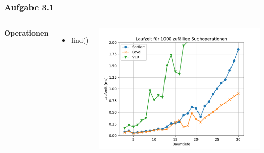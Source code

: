 \documentclass[aspectratio=169]{beamer}
\begin{document}
\begin{frame}
\frametitle{Aufgabe 3.1}
\begin{columns}[c] %
	
	\textbf{Operationen}
	\begin{itemize}
		\item find()
	\end{itemize}
	
	\includegraphics[scale=.6]{Figure_4.pdf}
	
	
\end{columns}
\end{frame}



							
\end{document}
